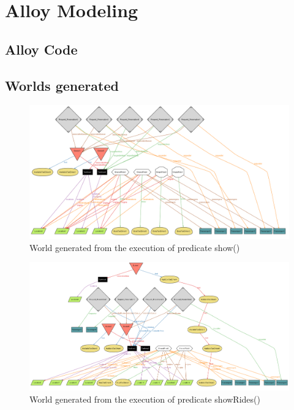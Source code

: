 \chapter{Alloy Modeling} \label{chap6}

\section{Alloy Code}



\section{Worlds generated}

\begin{figure}[htbp]
\centering
\includegraphics[width=1.5\textwidth, angle=90]{cpt/img/Show}
\caption{World generated from the execution of predicate show()}
\end{figure}
\clearpage

\begin{figure}[htbp]
\centering
\includegraphics[width=1.5\textwidth, angle=90]{cpt/img/ShowRides}
\caption{World generated from the execution of predicate showRides()}
\end{figure}
\clearpage